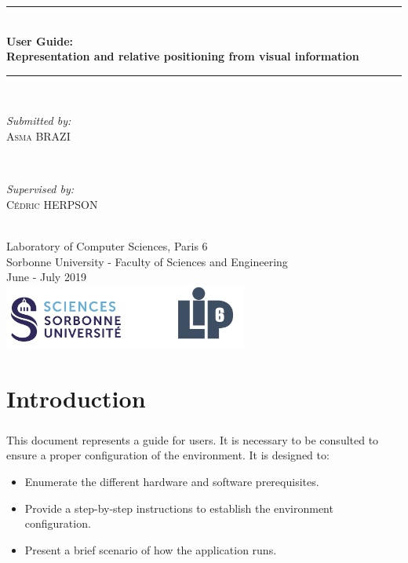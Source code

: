 \documentclass[12pt]{report}
\begin{document}
\begin{titlepage}

\newcommand{\HRule}{\rule{\linewidth}{0.5mm}} %

\center 
\HRule \\[0.4cm]
{ \huge \bfseries User Guide: \\Representation and relative positioning from visual information}\\[0.4cm]
\HRule \\[1.5cm]

\begin{minipage}{0.4\textwidth}
	\begin{flushleft} \large
		\emph{Submitted by:}\\
		\textsc{Asma BRAZI}
	\end{flushleft}
\end{minipage}
~
\begin{minipage}{0.4\textwidth}
	\begin{flushright} \large
		\emph{Supervised by:} \\
		\textsc{Cédric HERPSON}\\
	\end{flushright}
\end{minipage}\\[4cm]


{\large Laboratory of Computer Sciences, Paris 6 \\ Sorbonne University - Faculty of Sciences and Engineering}\\[3cm] 
{\large June - July 2019 }\\[3cm] 
\includegraphics[width=0.6\textwidth]{logo.png}\\[1cm] 
\vfill %

\end{titlepage}
\tableofcontents
\chapter{Introduction}
\paragraph{}
This document represents a guide for users. It is necessary to be consulted to ensure a proper configuration of the environment. It is designed to:
\begin{itemize}
    \item Enumerate the different hardware and software prerequisites.
    \item Provide a step-by-step instructions to establish the environment configuration.
    \item Present a brief scenario of how the application runs.
\end{itemize}
\end{document}
